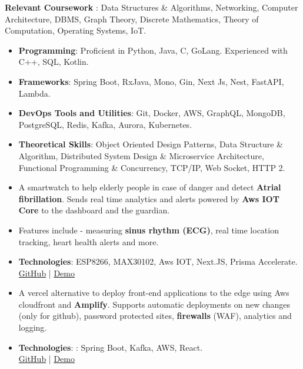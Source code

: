 
\smallskip
\normalsize
\textbf{Relevant Coursework} : Data Structures \& Algorithms, Networking, Computer Architecture, DBMS, Graph Theory, Discrete Mathematics, Theory of Computation, Operating Systems, IoT.


\smallskip
\begin{itemize}
\normalsize
\item \textbf{Programming}: Proficient in Python, Java, C, GoLang. Experienced with C++, SQL, Kotlin.
\smallskip
\item \textbf{Frameworks}: Spring Boot, RxJava, Mono, Gin, Next Js, Nest, FastAPI, Lambda.
\smallskip
\item \textbf{DevOps Tools and Utilities}: Git, Docker, AWS, GraphQL, MongoDB, PostgreSQL, Redis, Kafka, Aurora, Kubernetes.
\smallskip
\item \textbf{Theoretical Skills}: Object Oriented Design Patterns, Data Structure \& Algorithm, Distributed System Design \& Microservice Architecture, Functional Programming \& Concurrency, TCP/IP, Web Socket, HTTP 2.
\smallskip
\end{itemize}
  

\begin{itemize}
\normalsize
\item A smartwatch to help elderly people in case of danger and detect \textbf{Atrial fibrillation}. Sends real time analytics and alerts powered by \textbf{Aws IOT Core} to the dashboard and the guardian.
\item Features include - measuring \textbf{sinus rhythm (ECG)}, real time location tracking, heart health alerts and more.
\item \textbf{Technologies}: ESP8266, MAX30102, Aws IOT, Next.JS, Prisma Accelerate.\\
\textcolor{blue}{\href{https://github.com/shaiq-dev/panic-alarm}{GitHub}} | \textcolor{blue}{\href{https://panicalarm.shaiqkar.dev}{Demo}}
\end{itemize}
\smallskip
\smallskip

\begin{itemize}
\normalsize
\item A vercel alternative to deploy front-end applications to the edge using Aws cloudfront and \textbf{Amplify}. Supports automatic deployments on new changes (only for github), password protected sites, \textbf{firewalls} (WAF), analytics and logging.
\item \textbf{Technologies}: : Spring Boot, Kafka, AWS, React.\\
\textcolor{blue}{\href{https://github.com/shaiq-dev/deployhq}{GitHub}} | \textcolor{blue}{\href{https://deployhq.shaiqkar.dev}{Demo}}
\end{itemize}
\smallskip